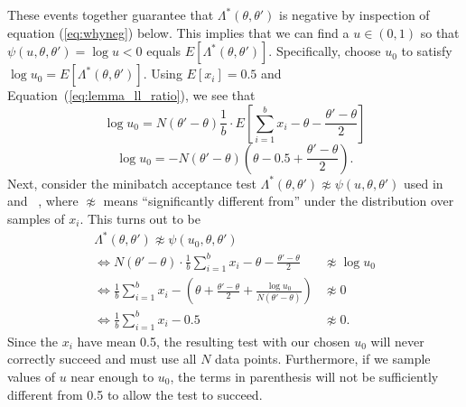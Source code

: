 \documentclass[twoside]{article} \usepackage{aistats2017}
\begin{document}
These events together guarantee that $\Lambda^*(\theta,\theta')$ is negative
by inspection of equation (\ref{eq:whyneg}) below.
This implies that we can find a $u \in (0,1)$ so that
$\psi(u,\theta,\theta') = \log u < 0$ equals $E[\Lambda^*(\theta,\theta')]$.
Specifically, choose $u_0$ to satisfy $\log u_0 = E[\Lambda^*(\theta,\theta')]$.
Using $E[x_i] = 0.5$ and Equation~(\ref{eq:lemma_ll_ratio}), we see that
\begin{equation}
  \log u_0 = N(\theta'-\theta)\frac{1}{b} \cdot E\left[\sum_{i=1}^b x_i-\theta-\frac{\theta'-\theta}{2}\right]
\end{equation}
\begin{equation}\label{eq:whyneg}
    \log u_0 = -N(\theta'-\theta)\left(\theta-0.5+\frac{\theta'-\theta}{2}\right).
\end{equation}
Next, consider the minibatch acceptance test $\Lambda^*(\theta,\theta') \not\approx
\psi(u,\theta,\theta')$ used in ~\cite{cutting_mh_2014} and~\cite{icml2014c1_bardenet14} , where $\not\approx$
means ``significantly different from'' under the distribution over
samples of $x_i$. This turns out to be
\begin{equation}
\begin{split}
\Lambda^*(\theta,\theta')  \not\approx \psi(u_0,\theta,\theta') & \quad \\
\iff N(\theta'-\theta) \cdot \frac{1}{b}\sum_{i=1}^b x_i-\theta-\frac{\theta'-\theta}{2} & \not\approx \log u_0\\
\iff \frac{1}{b}\sum_{i=1}^b x_i-\left(\theta+\frac{\theta'-\theta}{2} + \frac{\log u_0}{N(\theta'-\theta)}\right) & \not\approx  0 \\
\iff \frac{1}{b}\sum_{i=1}^b x_i-0.5 & \not\approx 0. \label{eq:accept_test_zero}
\end{split}
\end{equation}
Since the $x_i$ have mean 0.5, the resulting test with our chosen $u_0$ will
never correctly succeed and must use all $N$ data points.  Furthermore, if we
sample values of $u$ near enough to $u_0$, the terms in parenthesis will not be
sufficiently different from 0.5 to allow the test to succeed. 
  
\end{document}
